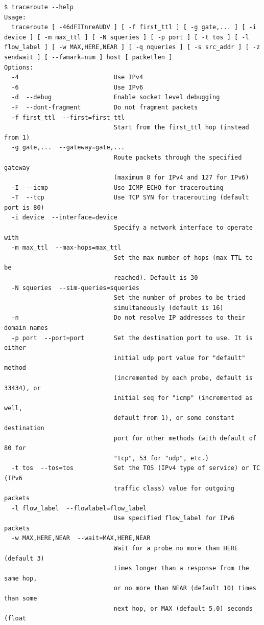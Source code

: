 \begin{verbatim}
$ traceroute --help
Usage:
  traceroute [ -46dFITnreAUDV ] [ -f first_ttl ] [ -g gate,... ] [ -i device ] [ -m max_ttl ] [ -N squeries ] [ -p port ] [ -t tos ] [ -l flow_label ] [ -w MAX,HERE,NEAR ] [ -q nqueries ] [ -s src_addr ] [ -z sendwait ] [ --fwmark=num ] host [ packetlen ]
Options:
  -4                          Use IPv4
  -6                          Use IPv6
  -d  --debug                 Enable socket level debugging
  -F  --dont-fragment         Do not fragment packets
  -f first_ttl  --first=first_ttl
                              Start from the first_ttl hop (instead from 1)
  -g gate,...  --gateway=gate,...
                              Route packets through the specified gateway
                              (maximum 8 for IPv4 and 127 for IPv6)
  -I  --icmp                  Use ICMP ECHO for tracerouting
  -T  --tcp                   Use TCP SYN for tracerouting (default port is 80)
  -i device  --interface=device
                              Specify a network interface to operate with
  -m max_ttl  --max-hops=max_ttl
                              Set the max number of hops (max TTL to be
                              reached). Default is 30
  -N squeries  --sim-queries=squeries
                              Set the number of probes to be tried
                              simultaneously (default is 16)
  -n                          Do not resolve IP addresses to their domain names
  -p port  --port=port        Set the destination port to use. It is either
                              initial udp port value for "default" method
                              (incremented by each probe, default is 33434), or
                              initial seq for "icmp" (incremented as well,
                              default from 1), or some constant destination
                              port for other methods (with default of 80 for
                              "tcp", 53 for "udp", etc.)
  -t tos  --tos=tos           Set the TOS (IPv4 type of service) or TC (IPv6
                              traffic class) value for outgoing packets
  -l flow_label  --flowlabel=flow_label
                              Use specified flow_label for IPv6 packets
  -w MAX,HERE,NEAR  --wait=MAX,HERE,NEAR
                              Wait for a probe no more than HERE (default 3)
                              times longer than a response from the same hop,
                              or no more than NEAR (default 10) times than some
                              next hop, or MAX (default 5.0) seconds (float

\end{verbatim}
